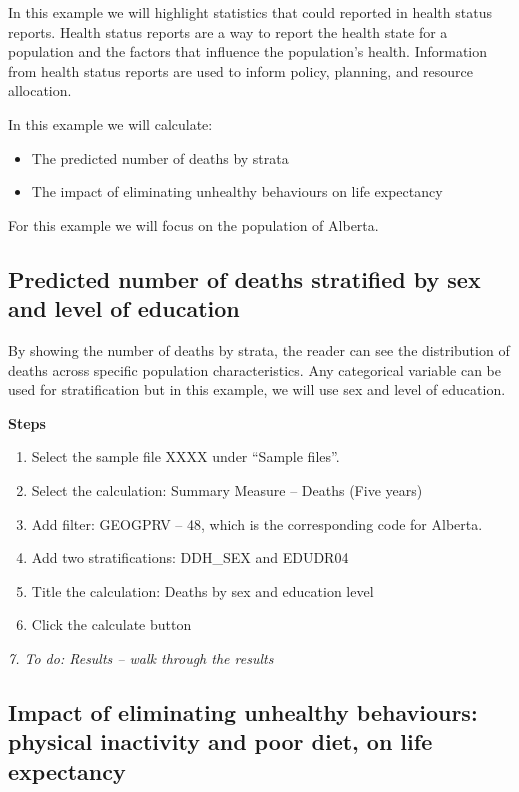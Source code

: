 \documentclass[]{book}
\providecommand{\tightlist}{%
  \setlength{\itemsep}{0pt}\setlength{\parskip}{0pt}}
\begin{document}
In this example we will highlight statistics that could reported in
health status reports. Health status reports are a way to report the
health state for a population and the factors that influence the
population's health. Information from health status reports are used to
inform policy, planning, and resource allocation.

In this example we will calculate:

\begin{itemize}
\tightlist
\item
  The predicted number of deaths by strata
\item
  The impact of eliminating unhealthy behaviours on life expectancy
\end{itemize}

For this example we will focus on the population of Alberta.

\subsection{Predicted number of deaths stratified by sex and level of
education}\label{predicted-number-of-deaths-stratified-by-sex-and-level-of-education}

By showing the number of deaths by strata, the reader can see the
distribution of deaths across specific population characteristics. Any
categorical variable can be used for stratification but in this example,
we will use sex and level of education.

\textbf{Steps}

\begin{enumerate}
\def\labelenumi{\arabic{enumi}.}
\item
  Select the sample file XXXX under ``Sample files''.
\item
  Select the calculation: Summary Measure -- Deaths (Five years)
\item
  Add filter: GEOGPRV -- 48, which is the corresponding code for
  Alberta.
\item
  Add two stratifications: DDH\_SEX and EDUDR04
\item
  Title the calculation: Deaths by sex and education level
\item
  Click the calculate button
\end{enumerate}

\emph{7. To do: Results -- walk through the results}

\subsection{Impact of eliminating unhealthy behaviours: physical
inactivity and poor diet, on life
expectancy}\label{impact-of-eliminating-unhealthy-behaviours-physical-inactivity-and-poor-diet-on-life-expectancy}
\end{document}
